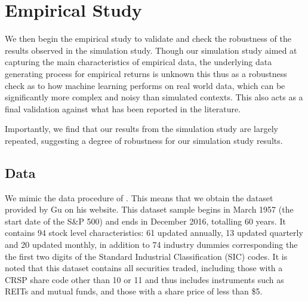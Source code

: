 \documentclass[11pt, a4paper, table]{article}
\begin{document}

\section{Empirical Study}

We then begin the empirical study to validate and check the robustness of the results observed in the simulation study. Though our simulation study aimed at capturing the main characteristics of empirical data, the underlying data generating process for empirical returns is unknown this thus as a robustness check as to how machine learning performs on real world data, which can be significantly more complex and noisy than simulated contexts. This also acts as a final validation against what has been reported in the literature.

Importantly, we find that our results from the simulation study are largely repeated, suggesting a degree of robustness for our simulation study results.

\subsection{Data}

We mimic the data procedure of \cite{gu_empirical_2018}. This means that we obtain the dataset provided by Gu on his website. This dataset sample begins in March 1957 (the start date of the S\&P 500) and ends in December 2016, totalling 60 years. It contains 94 stock level characteristics: 61 updated annually, 13 updated quarterly and 20 updated monthly, in addition to 74 industry dummies corresponding the the first two digits of the Standard Industrial Classification (SIC) codes. It is noted that this dataset contains all securities traded, including those with a CRSP share code other than 10 or 11 and thus includes instruments such as REITs and mutual funds, and those with a share price of less than \$5.

\end{document}
